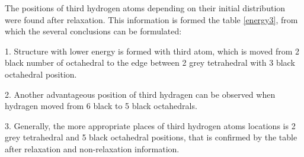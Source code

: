 The positions of third hydrogen atoms depending on their initial distribution were found after relaxation. This information is formed the table \ref{energy3}, from which the several conclusions can be formulated:

1. Structure with lower energy is formed with third atom, which is moved from 2 black number of octahedral to the edge between 2 grey tetrahedral with 3 black octahedral position. 

2. Another advantageous position of third hydragen can be observed when hydragen moved from 6 black to 5 black octahedrals.

3. Generally, the more appropriate places of third hydrogen atoms locations is 2 grey tetrahedral and 5 black octahedral positions, that is confirmed by the table after relaxation and non-relaxation information. 

